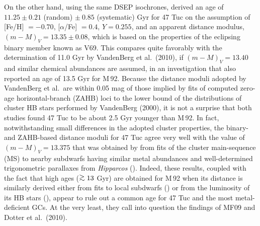 \documentclass[12pt,preprint]{aastex}
\newcommand\gta{\mathrel{\hbox{\raise 0.6 ex \hbox{$>$}\kern
                   -1.7 ex\lower .5 ex\hbox{$\sim$}}}}
\begin{document}
On the other hand, using the same DSEP isochrones, \citet{tkr10} derived an
age of $11.25 \pm 0.21$ (random) $\pm\ 0.85$ (systematic) Gyr for 47 Tuc on the
assumption of [Fe/H] $= -0.70$, [$\alpha$/Fe] $= 0.4$, $Y = 0.255$, and an
apparent distance modulus, $(m-M)_V = 13.35 \pm 0.08$, which is based on the
properties of the eclipsing binary member known as V69.  This compares quite
favorably with the determination of 11.0 Gyr by VandenBerg et al.~(2010), if
$(m-M)_V = 13.40$ and similar chemical abundances are assumed, in an
investigation that also reported an age of 13.5 Gyr for M$\,$92.  Because the
distance moduli adopted by VandenBerg et al.~are within 0.05 mag of those
implied by fits of computed zero-age horizontal-branch (ZAHB) loci to the lower
bound of the distributions of cluster HB stars performed by VandenBerg (2000),
it is not a surprise that both studies found 47 Tuc to be about 2.5 Gyr younger
than M$\,$92.  In fact, notwithstanding small differences in the adopted cluster
properties, the binary- and ZAHB-based distance moduli for 47 Tuc agree very
well with the value of $(m-M)_V = 13.375$ that was obtained by \citet{bs09}
from fits of the cluster main-sequence (MS) to nearby subdwarfs having similar
metal abundances and well-determined trigonometric parallaxes from {\it
Hipparcos} (\citealt{vl07}).  Indeed, these results, coupled with the fact that
high ages ($\gta 13$ Gyr) are obtained for M$\,$92 when its distance is
similarly derived either from fits to local subdwarfs (\citealt[][see their
Table 2]{apm09}) or from the luminosity of its HB stars (\citealt[also see
\citealt{bmf11}]{van00}), appear to rule out a common age for 47 Tuc and the
most metal-deficient GCs.  At the very least, they call into question the
findings of MF09 and Dotter et al.~(2010).
\end{document}
